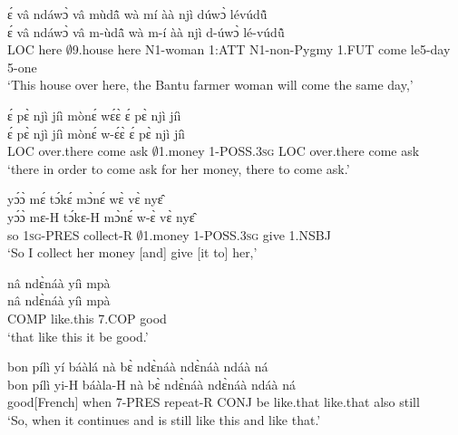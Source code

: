 \begin{exe} 
\exC\label{116}
  \glll ɛ́ vâ ndáwɔ̀ vâ mùdã̂ wà mí àà njì dúwɔ̀ lévúdũ̂ \\
       ɛ́ vâ ndáwɔ̀ vâ m-ùdã̂ wà m-í àà njì d-úwɔ̀ lé-vúdũ̂ \\
          LOC here $\emptyset$9.house here N1-woman 1:ATT N1-non-Pygmy 1.FUT come le5-day 5-one \\
    \trans `This house over here, the Bantu farmer woman will come the same day,'
\end{exe}

\begin{exe} 
\exC\label{117}
  \glll  ɛ́ pɛ̀ njì jíì mònɛ́ wɛ́ɛ̀ ɛ́ pɛ̀ njì jíì\\
         ɛ́ pɛ̀ njì jíì mònɛ́ w-ɛ́ɛ̀ ɛ́ pɛ̀ njì jíì\\
        LOC over.there come ask $\emptyset$1.money 1-POSS.3\textsc{sg} LOC over.there come ask\\
    \trans `there in order to come ask for her money, there to come ask.'
\end{exe}

\begin{exe} 
\exC\label{118}
  \glll  yɔ́ɔ̀ mɛ́ tɔ́kɛ́ mɔ̀nɛ́ wɛ̀ vɛ̀ nyɛ̂ \\
         yɔ́ɔ̀ mɛ-H tɔ́kɛ-H mɔ̀nɛ́ w-ɛ̀ vɛ̀ nyɛ̂ \\
         so 1\textsc{sg}-PRES collect-R $\emptyset$1.money 1-POSS.3\textsc{sg} give 1.NSBJ  \\
    \trans `So I collect her money [and] give [it to] her,'
\end{exe}

\begin{exe} 
\exC\label{119}
  \glll  nâ ndɛ̀náà  yíì mpà \\
      nâ ndɛ̀náà  yíì mpà \\
          COMP like.this 7.COP good  \\
    \trans `that like this it be good.'
\end{exe}

\begin{exe} 
\exC\label{120}
  \glll  bon pílì yí báàlá nà bɛ̀ ndɛ̀náà ndɛ̀náà ndáà ná \\
        bon pílì yi-H báàla-H nà bɛ̀ ndɛ̀náà ndɛ̀náà ndáà ná \\
          good[French] when 7-PRES repeat-R CONJ be like.that like.that also still  \\
    \trans `So, when it continues and is still like this and like that.'
\end{exe}

